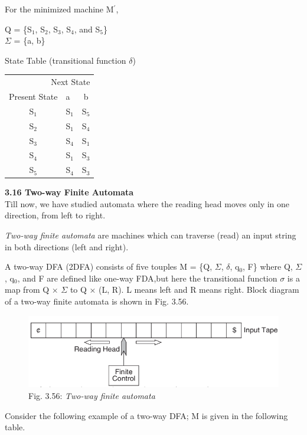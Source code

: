 \documentclass[11pt,apacite]{article}
\begin{document}
For the minimized machine M$^\prime$,

\begin{center}
	Q = \{S$_1$, S$_2$, S$_3$, S$_4$, and S$_5$\}\\
	$\Sigma$ = \{a, b\}
\end{center}

State Table (transitional function $\delta$)


\begin{center}
	\begin{tabular}{clc}  
		\toprule
		\multicolumn{3}{r}{Next State} \\
		\cmidrule(r){2-3}
		Present State    & a & b \\
		\midrule
		S$_1$        & S$_1$    & S$_5$     \\
		S$_2$        & S$_1$    & S$_4$      \\
		S$_3$        & S$_4$    & S$_1$   \\
		S$_4$        & S$_1$    & S$_3$      \\
		S$_5$ 		 & S$_4$    & S$_3$      \\
		\bottomrule
	\end{tabular}
\end{center}

\textbf{3.16 Two-way Finite Automata}\\

Till now, we have studied automata where the reading head moves only in one direction, from left to
right.

\emph{Two-way finite automata} are machines which can traverse (read) an input string in both directions
(left and right).

A two-way DFA (2DFA) consists of five touples M = \{Q, $\Sigma$, $\delta$, q$_0$, F\} where Q, $\Sigma$, q$_0$, and F are defined like one-way FDA,but here the transitional function $\sigma$ is a map from Q × $\Sigma$ to Q × (L, R). L means left
and R means right. Block diagram of a two-way finite automata is shown in Fig. 3.56.\\
\begin{figure}[H]
	\begin{center}
		\begin{center}
			\includegraphics[scale=.45]{Fig356.png}
		\end{center}
		\caption{Fig. 3.56: \emph{Two-way finite automata}}
	\end{center}
\end{figure}
Consider the following example of a two-way DFA; M is given in the following table.\\
\end{document}
